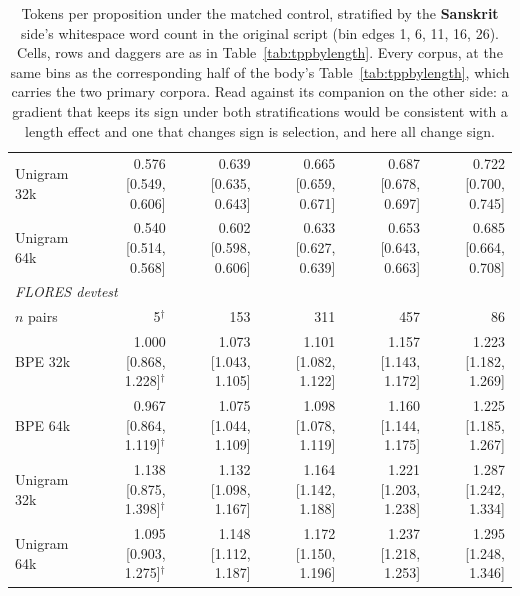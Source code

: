 \begin{table}[t]
\begin{tabular}{lrrrrr}
Unigram 32k & 0.576 [0.549, 0.606] & 0.639 [0.635, 0.643] & 0.665 [0.659, 0.671] & 0.687 [0.678, 0.697] & 0.722 [0.700, 0.745] \\
Unigram 64k & 0.540 [0.514, 0.568] & 0.602 [0.598, 0.606] & 0.633 [0.627, 0.639] & 0.653 [0.643, 0.663] & 0.685 [0.664, 0.708] \\
\midrule
\multicolumn{6}{l}{\emph{FLORES devtest}} \\
$n$ pairs & 5$^{\dagger}$ & 153 & 311 & 457 & 86 \\
BPE 32k & 1.000 [0.868, 1.228]$^{\dagger}$ & 1.073 [1.043, 1.105] & 1.101 [1.082, 1.122] & 1.157 [1.143, 1.172] & 1.223 [1.182, 1.269] \\
BPE 64k & 0.967 [0.864, 1.119]$^{\dagger}$ & 1.075 [1.044, 1.109] & 1.098 [1.078, 1.119] & 1.160 [1.144, 1.175] & 1.225 [1.185, 1.267] \\
Unigram 32k & 1.138 [0.875, 1.398]$^{\dagger}$ & 1.132 [1.098, 1.167] & 1.164 [1.142, 1.188] & 1.221 [1.203, 1.238] & 1.287 [1.242, 1.334] \\
Unigram 64k & 1.095 [0.903, 1.275]$^{\dagger}$ & 1.148 [1.112, 1.187] & 1.172 [1.150, 1.196] & 1.237 [1.218, 1.253] & 1.295 [1.248, 1.346] \\
\bottomrule
\end{tabular}
\caption{Tokens per proposition under the matched control, stratified by the \textbf{Sanskrit} side's whitespace word count in the original script (bin edges 1, 6, 11, 16, 26). Cells, rows and daggers are as in Table~\ref{tab:tppbylength}. Every corpus, at the same bins as the corresponding half of the body's Table~\ref{tab:tppbylength}, which carries the two primary corpora. Read against its companion on the other side: a gradient that keeps its sign under both stratifications would be consistent with a length effect and one that changes sign is selection, and here all \numLengthGradientsTotal{} change sign.}
\label{tab:tppbylengthallsa}
\end{table}
